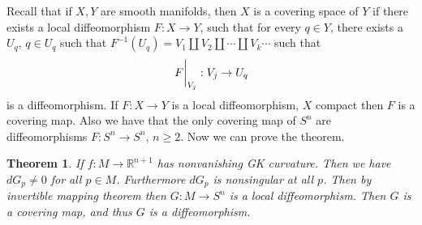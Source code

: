 \documentclass[a4paper]{article}
\newtheorem*{thm}{Theorem}
\begin{document}
Recall that if $X,Y$ are smooth manifolds, then $X$ is a covering space of $Y$ if there exists a local diffeomorphism $F: X \rightarrow Y$, such that for every $q \in Y$, there exists a $U_q$, $q \in U_q$ such that $F^{-1}(U_q) = V_1 \coprod V_2 \coprod \cdots \coprod V_k \cdots$ such that 
\[
  \eval{F}_{V_j}: V_j \rightarrow U_q
\]
is a diffeomorphism. If $F: X \rightarrow Y$ is a local diffeomorphism, $X$ compact then $F$ is a covering map. Also we have that the only covering map of $S^n$ are diffeomorphisms $F: S^n \rightarrow S^n$, $n \geq 2$. Now we can prove the theorem.

\begin{thm}
  If $f:M \rightarrow \mathds{R}^{n+1}$ has nonvanishing GK curvature. Then we have $dG_p \neq 0$ for all $p \in M$. Furthermore $dG_p$ is nonsingular at all $p$. Then by invertible mapping theorem then $G:M \rightarrow S^n$ is a local diffeomorphism. Then $G$ is a covering map, and thus $G$ is a diffeomorphism.
\end{thm}
\end{document}
